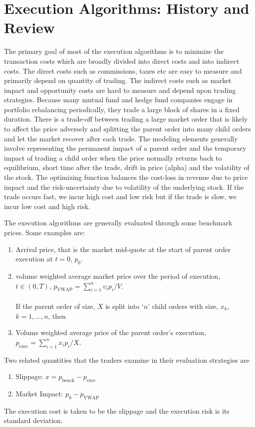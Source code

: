 \section{Execution Algorithms:  History and Review}

The primary goal of most of the execution algorithms is to minimize the transaction costs which are broadly divided into direct costs and into indirect costs. The direct costs such as commissions, taxes etc are easy to measure and primarily depend on quantity of trading. The indirect costs such as market impact and opportunity costs are hard to measure and depend upon trading strategies. Because many mutual fund and hedge fund companies engage in portfolio rebalancing periodically, they trade a large block of shares in a fixed duration. There is a trade-off between trading a large market order that is likely to affect the price adversely and splitting the parent order into many child orders and let the market recover after each trade. The modeling elements generally involve representing the permanent impact of a parent order and the temporary impact of trading a child order when the price normally returns back to equilibrium, short time after the trade, drift in price (alpha) and the volatility of the stock. The optimizing function balances the cost-loss in revenue due to price impact and the risk-uncertainty due to volatility of the underlying stock. If the trade occurs fast, we incur high cost and low risk but if the trade is slow, we incur low cost and high risk.


The execution algorithms are generally evaluated through some benchmark prices. Some examples are:
	\begin{enumerate}[--]
	\item Arrival price, that is the market mid-quote at the start of parent order execution at $t=0$, $p_0$.
	\item volume weighted average market price over the period of execution, $t \in (0,T)$, $p_{\text{VWAP}}= \sum_{i=1}^n v_ip_i/V$. \\ \\
	If the parent order of size, $X$ is split into `$n$' child orders with size, $x_k$, $k=1,\ldots,n$, then
	\item Volume weighted average price of the parent order's execution, $p_{\text{exec}}= \sum_{i=1}^n x_ip_i/X$. 
	\end{enumerate}
	
	Two related quantities that the traders examine in their evaluation strategies are
	\begin{enumerate}[--]
	\item Slippage: $x=p_{\text{bench}} - p_{\text{exec}}$
	\item Market Impact: $p_0 - p_{\text{VWAP}}$
	\end{enumerate}
The execution cost is taken to be the slippage and the execution risk is its standard deviation. 


